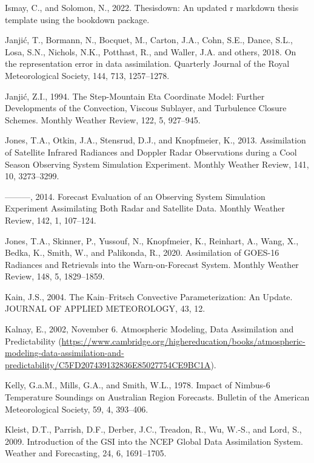 \documentclass[12pt,oneside,a4paper]{reedthesis}
\begin{document}
\leavevmode\hypertarget{ref-ismay2022}{}%
Ismay, C., and Solomon, N., 2022. Thesisdown: An updated r markdown thesis template using the bookdown package.

\leavevmode\hypertarget{ref-janjic2018}{}%
Janjić, T., Bormann, N., Bocquet, M., Carton, J.A., Cohn, S.E., Dance, S.L., Losa, S.N., Nichols, N.K., Potthast, R., and Waller, J.A. and others, 2018. On the representation error in data assimilation. Quarterly Journal of the Royal Meteorological Society, 144, 713, 1257--1278.

\leavevmode\hypertarget{ref-janjic1994}{}%
Janjić, Z.I., 1994. The Step-Mountain Eta Coordinate Model: Further Developments of the Convection, Viscous Sublayer, and Turbulence Closure Schemes. Monthly Weather Review, 122, 5, 927--945.

\leavevmode\hypertarget{ref-jones2013}{}%
Jones, T.A., Otkin, J.A., Stensrud, D.J., and Knopfmeier, K., 2013. Assimilation of Satellite Infrared Radiances and Doppler Radar Observations during a Cool Season Observing System Simulation Experiment. Monthly Weather Review, 141, 10, 3273--3299.

\leavevmode\hypertarget{ref-jones2014}{}%
---------, 2014. Forecast Evaluation of an Observing System Simulation Experiment Assimilating Both Radar and Satellite Data. Monthly Weather Review, 142, 1, 107--124.

\leavevmode\hypertarget{ref-jones2020}{}%
Jones, T.A., Skinner, P., Yussouf, N., Knopfmeier, K., Reinhart, A., Wang, X., Bedka, K., Smith, W., and Palikonda, R., 2020. Assimilation of GOES-16 Radiances and Retrievals into the Warn-on-Forecast System. Monthly Weather Review, 148, 5, 1829--1859.

\leavevmode\hypertarget{ref-kain2004}{}%
Kain, J.S., 2004. The Kain--Fritsch Convective Parameterization: An Update. JOURNAL OF APPLIED METEOROLOGY, 43, 12.

\leavevmode\hypertarget{ref-kalnay2002}{}%
Kalnay, E., 2002, November 6. Atmospheric Modeling, Data Assimilation and Predictability (\url{https://www.cambridge.org/highereducation/books/atmospheric-modeling-data-assimilation-and-predictability/C5FD207439132836E85027754CE9BC1A}).

\leavevmode\hypertarget{ref-kelly1978}{}%
Kelly, G.a.M., Mills, G.A., and Smith, W.L., 1978. Impact of Nimbus-6 Temperature Soundings on Australian Region Forecasts. Bulletin of the American Meteorological Society, 59, 4, 393--406.

\leavevmode\hypertarget{ref-kleist2009}{}%
Kleist, D.T., Parrish, D.F., Derber, J.C., Treadon, R., Wu, W.-S., and Lord, S., 2009. Introduction of the GSI into the NCEP Global Data Assimilation System. Weather and Forecasting, 24, 6, 1691--1705.
\end{document}
